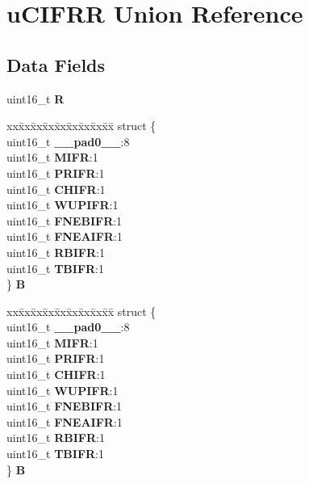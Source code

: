 \hypertarget{unionuCIFRR}{}\section{u\+C\+I\+F\+RR Union Reference}
\label{unionuCIFRR}
\subsection*{Data Fields}
\begin{DoxyCompactItemize}
\item 
\mbox{\label{unionuCIFRR_af06848967fdb53cd69d7d1d95a46db65}} 
uint16\+\_\+t {\bfseries R}
\item 
\mbox{\label{unionuCIFRR_a6d2b69a896f90033e4d3de13ecbe5f1c}} 
\begin{tabbing}
xx\=xx\=xx\=xx\=xx\=xx\=xx\=xx\=xx\=\kill
struct \{\\
\>uint16\_t {\bfseries \_\_pad0\_\_}:8\\
\>uint16\_t {\bfseries MIFR}:1\\
\>uint16\_t {\bfseries PRIFR}:1\\
\>uint16\_t {\bfseries CHIFR}:1\\
\>uint16\_t {\bfseries WUPIFR}:1\\
\>uint16\_t {\bfseries FNEBIFR}:1\\
\>uint16\_t {\bfseries FNEAIFR}:1\\
\>uint16\_t {\bfseries RBIFR}:1\\
\>uint16\_t {\bfseries TBIFR}:1\\
\} {\bfseries B}\\

\end{tabbing}\item 
\mbox{\label{unionuCIFRR_ae99c5c87ad894e38e0db5cc02c6ca545}} 
\begin{tabbing}
xx\=xx\=xx\=xx\=xx\=xx\=xx\=xx\=xx\=\kill
struct \{\\
\>uint16\_t {\bfseries \_\_pad0\_\_}:8\\
\>uint16\_t {\bfseries MIFR}:1\\
\>uint16\_t {\bfseries PRIFR}:1\\
\>uint16\_t {\bfseries CHIFR}:1\\
\>uint16\_t {\bfseries WUPIFR}:1\\
\>uint16\_t {\bfseries FNEBIFR}:1\\
\>uint16\_t {\bfseries FNEAIFR}:1\\
\>uint16\_t {\bfseries RBIFR}:1\\
\>uint16\_t {\bfseries TBIFR}:1\\
\} {\bfseries B}\\


\end{tabbing}
\end{DoxyCompactItemize}
